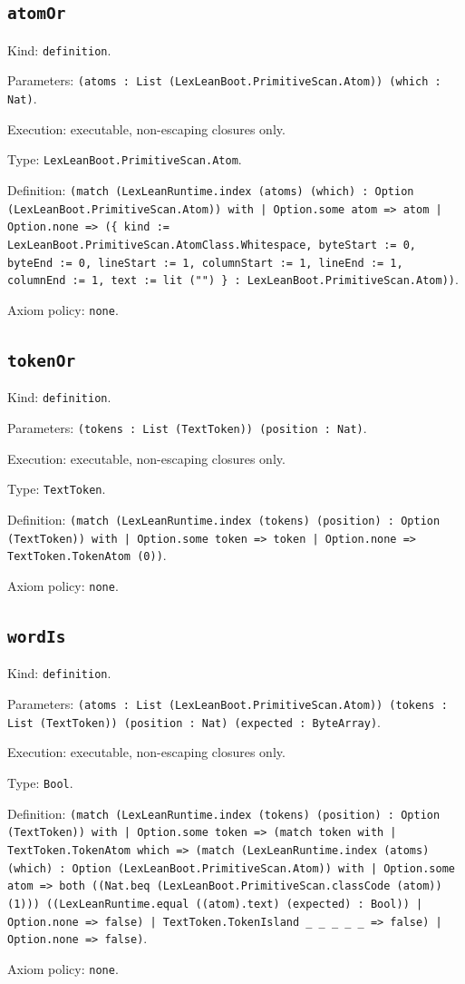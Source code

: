 \documentclass[11pt]{article}
\begin{document}
\subsection*{\texttt{atomOr}}
\noindent Kind: \texttt{definition}.\par
\noindent Parameters: \texttt{(atoms : List (LexLeanBoot.PrimitiveScan.Atom)) (which : Nat)}.\par
\noindent Execution: executable, non-escaping closures only.\par
\noindent Type: \texttt{LexLeanBoot.PrimitiveScan.Atom}.\par
\noindent Definition: \texttt{(match (LexLeanRuntime.index (atoms) (which) : Option (LexLeanBoot.PrimitiveScan.Atom)) with | Option.some atom => atom | Option.none => (\{ kind := LexLeanBoot.PrimitiveScan.AtomClass.Whitespace, byteStart := 0, byteEnd := 0, lineStart := 1, columnStart := 1, lineEnd := 1, columnEnd := 1, text := lit ("") \} : LexLeanBoot.PrimitiveScan.Atom))}.\par
\noindent Axiom policy: \texttt{none}.\par
\subsection*{\texttt{tokenOr}}
\noindent Kind: \texttt{definition}.\par
\noindent Parameters: \texttt{(tokens : List (TextToken)) (position : Nat)}.\par
\noindent Execution: executable, non-escaping closures only.\par
\noindent Type: \texttt{TextToken}.\par
\noindent Definition: \texttt{(match (LexLeanRuntime.index (tokens) (position) : Option (TextToken)) with | Option.some token => token | Option.none => TextToken.TokenAtom (0))}.\par
\noindent Axiom policy: \texttt{none}.\par
\subsection*{\texttt{wordIs}}
\noindent Kind: \texttt{definition}.\par
\noindent Parameters: \texttt{(atoms : List (LexLeanBoot.PrimitiveScan.Atom)) (tokens : List (TextToken)) (position : Nat) (expected : ByteArray)}.\par
\noindent Execution: executable, non-escaping closures only.\par
\noindent Type: \texttt{Bool}.\par
\noindent Definition: \texttt{(match (LexLeanRuntime.index (tokens) (position) : Option (TextToken)) with | Option.some token => (match token with | TextToken.TokenAtom which => (match (LexLeanRuntime.index (atoms) (which) : Option (LexLeanBoot.PrimitiveScan.Atom)) with | Option.some atom => both ((Nat.beq (LexLeanBoot.PrimitiveScan.classCode (atom)) (1))) ((LexLeanRuntime.equal ((atom).text) (expected) : Bool)) | Option.none => false) | TextToken.TokenIsland \_ \_ \_ \_ \_ => false) | Option.none => false)}.\par
\noindent Axiom policy: \texttt{none}.\par
\end{document}
